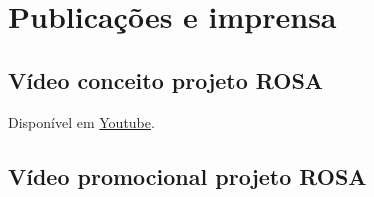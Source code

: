 \documentclass[a4paper,11pt,oneside,brazilian,
draft=false]{report}%
\newcommand*{\standardchapterstyle}{%
  \titleformat{\chapter}[display]
  {\normalfont\huge\bfseries}{\chaptertitlename\ \thechapter}{20pt}{\Huge}
  \titlespacing*{\chapter}{0pt}{50pt}{40pt}
}
\begin{document}


\chapter{Publicações e imprensa}





\section{Vídeo conceito projeto ROSA}
Disponível em \href{https://youtu.be/Cw6f-8JNUK0}{Youtube}.


\section{Vídeo promocional projeto ROSA} 

%

\standardchapterstyle   
\end{document}
